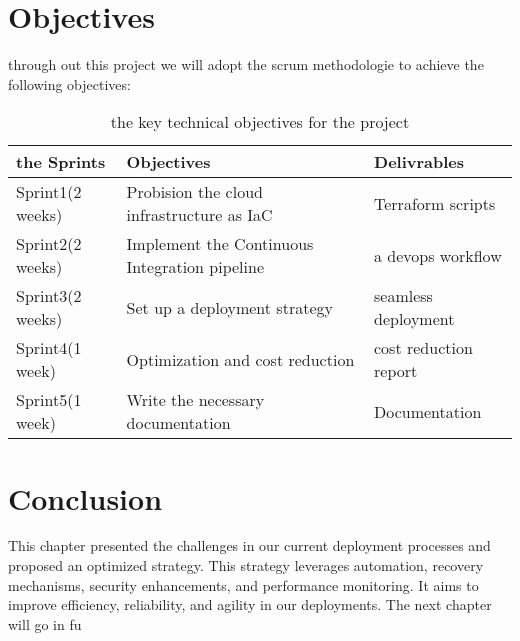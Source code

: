 \section{Objectives}
through out  this project we will adopt the scrum methodologie to achieve the following objectives:
\begin{longtable}[c]{
    |p{}
    |p{}|
    p{}|
}
    \caption{the key technical objectives for the project}
    \label{tab:myfirstlongtable}\\
    \hline
    
    the Sprints
    & Objectives
    & Delivrables \\
     \hline

    Sprint1(2 weeks)
    & Probision the cloud infrastructure as IaC
    & Terraform scripts \\
    \hline

    Sprint2(2 weeks)
    & Implement the Continuous Integration pipeline
    & a devops workflow \\
    \hline

    Sprint3(2 weeks)
    & Set up a deployment strategy 
    & seamless deployment\\
    \hline

    Sprint4(1 week)
    & Optimization and cost reduction
    & cost reduction report\\
    \hline

    Sprint5(1 week)
    & Write the necessary documentation
    & Documentation\\
    \hline
    
\end{longtable}

\section*{Conclusion}
This chapter presented the challenges in our current deployment processes and proposed an optimized strategy. This strategy leverages automation, recovery mechanisms, security enhancements, and performance monitoring. It aims to improve efficiency, reliability, and agility in our deployments. The next chapter will go in fu
\vspace{0.5cm}
